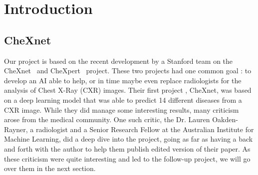 \documentclass[11pt]{article}
\begin{document}
    \section{Introduction}

    \subsection{CheXnet}

        Our project is based on the recent development by a Stanford team on the CheXnet~\cite{chexnet}
        and CheXpert~\cite{chexpert} project. These two projects had  one common goal : to develop an AI
        able to help, or in time maybe even replace radiologists for the analysis of Chest X-Ray (CXR) images. Their
        first project , CheXnet, was based on a deep learning model that was able to predict 14 different diseases
        from a CXR image.
        While they did manage some interesting results, many criticism arose from the medical community. One such
        critic, the Dr. Lauren Oakden-Rayner, a radiologist and a Senior Research Fellow at the Australian Institute
        for Machine Learning, did a deep dive into the project, going as far as having a back and forth with the
        author to help them publish edited version of their paper. As these criticism were quite interesting and led
        to the follow-up project, we will go over them in the next section.
\end{document}
